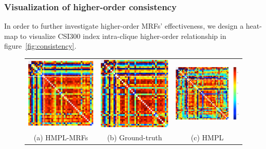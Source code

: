 \documentclass[sigconf,anonymous,review]{acmart}
\begin{document}
\subsubsection{Visualization of higher-order consistency}

In order to further investigate higher-order MRFs' effectiveness,
we design a heat-map to visualize CSI300 index intra-clique
higher-order relationship in figure~\ref{fig:consistency}.

\begin{figure}[t]
  \centering
  \setlength{\tabcolsep}{20pt}
  \begin{tabular}{ccc}
    \includegraphics[width=0.5\columnwidth]{Methodology/figures/mrf.png}&
                                                                           \includegraphics[width=0.5\columnwidth]{Methodology/figures/gt.png}&
\includegraphics[width=0.59\columnwidth]{Methodology/figures/hmpl.png}\\                                                                        {\small (a) HMPL-MRFs} & {\small (b) Ground-truth} & {\small (c) HMPL} 

\end{tabular}
\end{figure}
\end{document}
